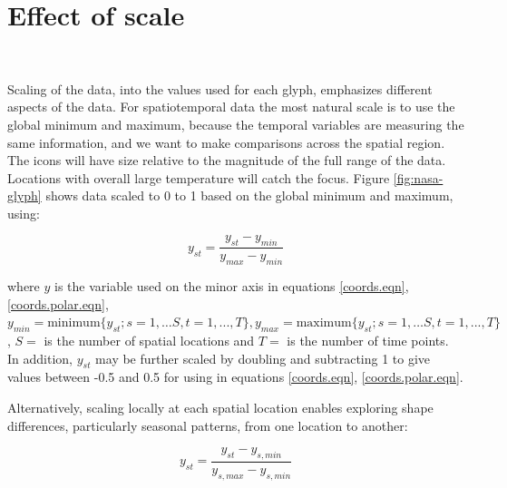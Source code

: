 \documentclass[oneside]{article}
\begin{document}
\section{Effect of scale}~\label{sec:scale}


Scaling of the data, into the values used for each glyph, emphasizes different aspects of the data. For spatiotemporal data the most natural scale is to use the global minimum and maximum, because the temporal variables are measuring the same information, and we want to make comparisons across the spatial region. The icons will have size relative to the magnitude of the full range of the data. Locations with overall large temperature will catch the focus. Figure \ref{fig:nasa-glyph} shows data scaled to 0 to 1 based on the global minimum and maximum, using:

\begin{equation}
y_{st} = \frac{y_{st}-y_{min}}{y_{max}-y_{min}} %
\label{scale1}
\end{equation}

\noindent where $y$ is the variable used on the minor axis in equations \ref{coords.eqn}, \ref{coords.polar.eqn}, $y_{min} = \mbox{minimum}\{y_{st}; s=1, \dots S, t=1, ..., T \}, y_{max} = \mbox{maximum}\{y_{st}; s=1, \dots S, t=1, ..., T\}$, $S=$ is the number of spatial locations and $T=$ is the number of time points. In addition, $y_{st}$ may be further scaled by doubling and subtracting 1 to give values between -0.5 and 0.5 for using in equations \ref{coords.eqn}, \ref{coords.polar.eqn}.

Alternatively, scaling locally at each spatial location enables exploring shape differences, particularly seasonal patterns, from one location to another:

\begin{equation}
y_{st} = \frac{y_{st}-y_{s,min}}{y_{s,max}-y_{s,min}} %
\label{scale2}
\end{equation}
\end{document}
